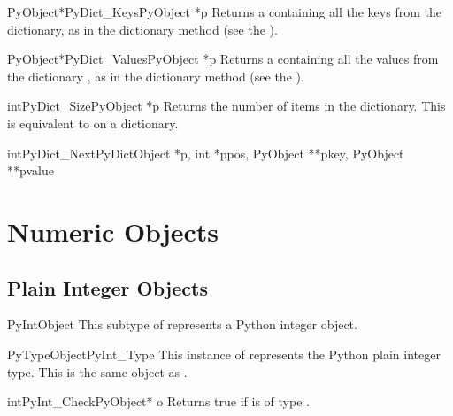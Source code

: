 \documentclass{manual}
\begin{document}
\begin{cfuncdesc}{PyObject*}{PyDict_Keys}{PyObject *p}
Returns a  containing all the keys 
from the dictionary, as in the dictionary method  (see the
).
\end{cfuncdesc}

\begin{cfuncdesc}{PyObject*}{PyDict_Values}{PyObject *p}
Returns a  containing all the values 
from the dictionary , as in the dictionary method
 (see the ).
\end{cfuncdesc}

\begin{cfuncdesc}{int}{PyDict_Size}{PyObject *p}
Returns the number of items in the dictionary.  This is equivalent to
 on a dictionary.
\end{cfuncdesc}

\begin{cfuncdesc}{int}{PyDict_Next}{PyDictObject *p, int *ppos,
                                    PyObject **pkey, PyObject **pvalue}

\end{cfuncdesc}


\section{Numeric Objects \label{numericObjects}}



\subsection{Plain Integer Objects \label{intObjects}}

\begin{ctypedesc}{PyIntObject}
This subtype of  represents a Python integer object.
\end{ctypedesc}

\begin{cvardesc}{PyTypeObject}{PyInt_Type}
This instance of  represents the Python plain 
integer type.  This is the same object as .
\end{cvardesc}

\begin{cfuncdesc}{int}{PyInt_Check}{PyObject* o}
Returns true if  is of type .
\end{cfuncdesc}
\end{document}
